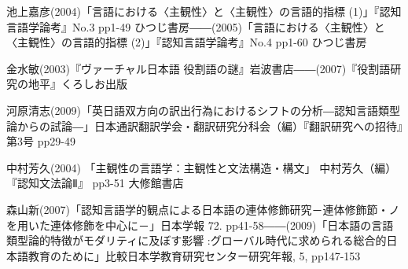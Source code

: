 池上嘉彦(2004)「言語における〈主観性〉と〈主観性〉の言語的指標 (1)」『認知言語学論考』No.3 pp1-49 ひつじ書房――(2005)「言語における〈主観性〉と〈主観性〉の言語的指標 (2)」『認知言語学論考』No.4 pp1-60 ひつじ書房

金水敏(2003)『ヴァーチャル日本語 役割語の謎』岩波書店――(2007)『役割語研究の地平』くろしお出版

河原清志(2009)「英日語双方向の訳出行為におけるシフトの分析―認知言語類型論からの試論―」日本通訳翻訳学会・翻訳研究分科会（編）『翻訳研究への招待』第3号 pp29-49

中村芳久(2004) 「主観性の言語学：主観性と文法構造・構文」 中村芳久（編）『認知文法論Ⅱ』 pp3-51 大修館書店

森山新(2007)「認知言語学的観点による日本語の連体修飾研究－連体修飾節・ノを用いた連体修飾を中心に－」日本学報 72. pp41-58――(2009)「日本語の言語類型論的特徴がモダリティに及ぼす影響 :グローバル時代に求められる総合的日本語教育のために」比較日本学教育研究センター研究年報, 5, pp147-153

